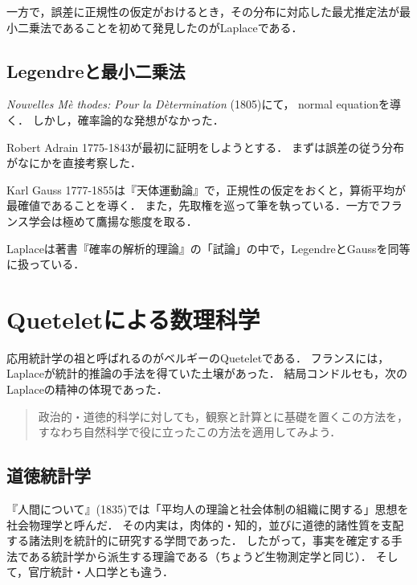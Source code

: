 \documentclass[uplatex,dvipdfmx]{jsreport}
\begin{document}
一方で，誤差に正規性の仮定がおけるとき，その分布に対応した最尤推定法が最小二乗法であることを初めて発見したのがLaplaceである．

\subsection{Legendreと最小二乗法}

\textit{Nouvelles M\`{e} thodes: Pour la D\`{e}termination} (1805)にて，
normal equationを導く．
しかし，確率論的な発想がなかった．

Robert Adrain 1775-1843が最初に証明をしようとする．
まずは誤差の従う分布がなにかを直接考察した．

Karl Gauss 1777-1855は『天体運動論』で，正規性の仮定をおくと，算術平均が最確値であることを導く．
また，先取権を巡って筆を執っている．一方でフランス学会は極めて鷹揚な態度を取る．

Laplaceは著書『確率の解析的理論』の「試論」の中で，LegendreとGaussを同等に扱っている．

\section{Queteletによる数理科学}

\begin{tcolorbox}[colframe=ForestGreen, colback=ForestGreen!10!white,breakable,colbacktitle=ForestGreen!40!white,coltitle=black,fonttitle=\bfseries\sffamily,
title=自然科学を回転させようとした試み]
    応用統計学の祖と呼ばれるのがベルギーのQueteletである．
    フランスには，Laplaceが統計的推論の手法を得ていた土壌があった．
    結局コンドルセも，次のLaplaceの精神の体現であった．
    \begin{quote}
        政治的・道徳的科学に対しても，観察と計算とに基礎を置くこの方法を，すなわち自然科学で役に立ったこの方法を適用してみよう．
    \end{quote}
\end{tcolorbox}

\subsection{道徳統計学}

『人間について』(1835)では「平均人の理論と社会体制の組織に関する」思想を社会物理学と呼んだ．
その内実は，肉体的・知的，並びに道徳的諸性質を支配する諸法則を統計的に研究する学問であった．
したがって，事実を確定する手法である統計学から派生する理論である（ちょうど生物測定学と同じ）．
そして，官庁統計・人口学とも違う．
\end{document}

